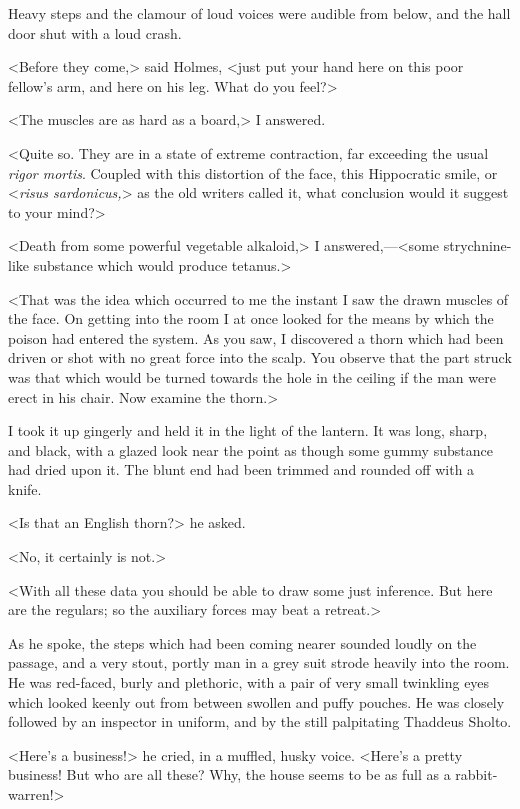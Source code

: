 Heavy steps and the clamour of loud voices were audible from below, and the hall door shut with a loud crash.

<Before they come,> said Holmes, <just put your hand here on this poor fellow's arm, and here on his leg. What do you feel?>

<The muscles are as hard as a board,> I answered.

<Quite so. They are in a state of extreme contraction, far exceeding the usual \textit{rigor mortis}. Coupled with this distortion of the face, this Hippocratic smile, or <\textit{risus sardonicus,}> as the old writers called it, what conclusion would it suggest to your mind?>

<Death from some powerful vegetable alkaloid,> I answered,—<some strychnine-like substance which would produce tetanus.>

<That was the idea which occurred to me the instant I saw the drawn muscles of the face. On getting into the room I at once looked for the means by which the poison had entered the system. As you saw, I discovered a thorn which had been driven or shot with no great force into the scalp. You observe that the part struck was that which would be turned towards the hole in the ceiling if the man were erect in his chair. Now examine the thorn.>

I took it up gingerly and held it in the light of the lantern. It was long, sharp, and black, with a glazed look near the point as though some gummy substance had dried upon it. The blunt end had been trimmed and rounded off with a knife.

<Is that an English thorn?> he asked.

<No, it certainly is not.>

<With all these data you should be able to draw some just inference. But here are the regulars; so the auxiliary forces may beat a retreat.>

As he spoke, the steps which had been coming nearer sounded loudly on the passage, and a very stout, portly man in a grey suit strode heavily into the room. He was red-faced, burly and plethoric, with a pair of very small twinkling eyes which looked keenly out from between swollen and puffy pouches. He was closely followed by an inspector in uniform, and by the still palpitating Thaddeus Sholto.

<Here's a business!> he cried, in a muffled, husky voice. <Here's a pretty business! But who are all these? Why, the house seems to be as full as a rabbit-warren!>

